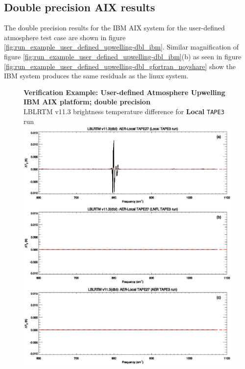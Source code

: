 \subsection{Double precision AIX results}

The double precision results for the IBM AIX system for the user-defined atmosphere test case are shown in figure \ref{fig:run_example_user_defined_upwelling-dbl_ibm}. Similar magnification of figure \ref{fig:run_example_user_defined_upwelling-dbl_ibm}(b) as seen in figure \ref{fig:run_example_user_defined_upwelling-dbl_gfortran_noyshare} show the IBM system produces the same residuals as the linux system.

\begin{figure}[htp]
  \centering
  \qquad\sffamily\textbf{Verification Example: User-defined Atmosphere Upwelling}\\
  \qquad\sffamily\textbf{IBM AIX platform; double precision}\\
  \qquad\textsf{LBLRTM v11.3 brightness temperature difference for \textbf{Local} \texttt{TAPE3} run}\\
  \includegraphics[bb=82 490 534 648,clip,scale=1.0]{graphics/run_example_user_defined_upwelling/ibm/dbl.eps}

\end{figure}
